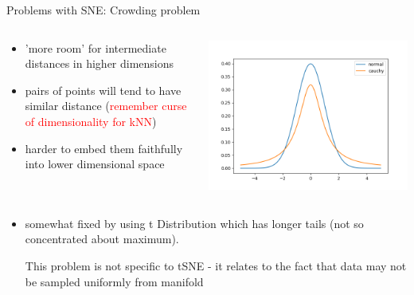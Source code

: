 \documentclass[unknownkeysallowed]{beamer}
\begin{document}
\begin{frame}{Problems with SNE: Crowding problem}

\begin{columns}[onlytextwidth]
\begin{column}[T]{.48\textwidth}
\begin{itemize}
	\item 'more room' for intermediate distances in higher dimensions

	\item pairs of points will tend to have similar distance (\textcolor{red}{remember curse of dimensionality for kNN})
	\item harder to embed them faithfully into lower dimensional space

\end{itemize}
\end{column}

\begin{column}[T]{.48\textwidth}
\includegraphics[width=\textwidth]{long_tail.png}
\end{column}
\end{columns}

\begin{itemize}
\item somewhat fixed by using t Distribution which has longer tails (not so concentrated about maximum).

This problem is not specific to tSNE - it relates to the fact that data may not be sampled uniformly from manifold
\end{itemize}

\end{frame}
\end{document}
